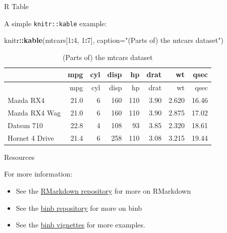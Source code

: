 \documentclass[14pt,ignorenonframetext,compress]{beamer}
\newenvironment{Shaded}{\begin{snugshade}}{\end{snugshade}}
\newcommand{\DataTypeTok}[1]{\textcolor[rgb]{0.13,0.29,0.53}{#1}}
\newcommand{\DecValTok}[1]{\textcolor[rgb]{0.00,0.00,0.81}{#1}}
\newcommand{\KeywordTok}[1]{\textcolor[rgb]{0.13,0.29,0.53}{\textbf{#1}}}
\newcommand{\NormalTok}[1]{#1}
\newcommand{\OperatorTok}[1]{\textcolor[rgb]{0.81,0.36,0.00}{\textbf{#1}}}
\newcommand{\StringTok}[1]{\textcolor[rgb]{0.31,0.60,0.02}{#1}}
\providecommand{\tightlist}{%
  \setlength{\itemsep}{0pt}\setlength{\parskip}{0pt}}
\renewenvironment{Shaded}{\color{black}\begin{snugshade}\color{black}}{\end{snugshade}}
\begin{document}
\begin{frame}[fragile]{R Table}
\protect\hypertarget{r-table}{}

A simple \texttt{knitr::kable} example:

\small

\begin{Shaded}
\begin{Highlighting}[]
\NormalTok{knitr}\OperatorTok{::}\KeywordTok{kable}\NormalTok{(mtcars[}\DecValTok{1}\OperatorTok{:}\DecValTok{4}\NormalTok{, }\DecValTok{1}\OperatorTok{:}\DecValTok{7}\NormalTok{],}
       \DataTypeTok{caption=}\StringTok{"(Parts of) the mtcars dataset"}\NormalTok{)}
\end{Highlighting}
\end{Shaded}

\begin{longtable}[]{@{}lrrrrrrr@{}}
\caption{(Parts of) the mtcars dataset}\tabularnewline
\toprule
& mpg & cyl & disp & hp & drat & wt & qsec\tabularnewline
\midrule
\endfirsthead
\toprule
& mpg & cyl & disp & hp & drat & wt & qsec\tabularnewline
\midrule
\endhead
Mazda RX4 & 21.0 & 6 & 160 & 110 & 3.90 & 2.620 & 16.46\tabularnewline
Mazda RX4 Wag & 21.0 & 6 & 160 & 110 & 3.90 & 2.875 &
17.02\tabularnewline
Datsun 710 & 22.8 & 4 & 108 & 93 & 3.85 & 2.320 & 18.61\tabularnewline
Hornet 4 Drive & 21.4 & 6 & 258 & 110 & 3.08 & 3.215 &
19.44\tabularnewline
\bottomrule
\end{longtable}

\end{frame}

\begin{frame}{Resources}
\protect\hypertarget{resources}{}

\begin{block}{For more information:}

\begin{itemize}
\tightlist
\item
  See the \href{https://github.com/rstudio/rmarkdown}{RMarkdown
  repository} for more on RMarkdown
\item
  See the \href{https://github.com/eddelbuettel/binb}{binb repository}
  for more on binb
\item
  See the \href{https://github.com/eddelbuettel/binb/vignettes}{binb
  vignettes} for more examples.
\end{itemize}

\end{block}

\end{frame}
\end{document}
